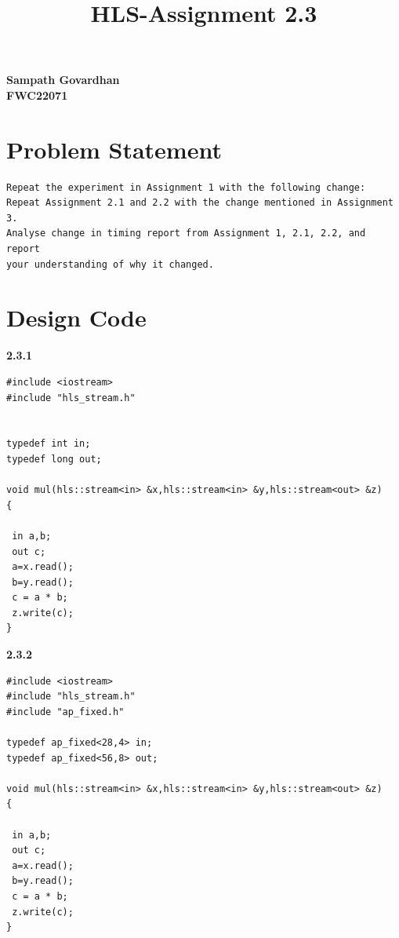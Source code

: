 \documentclass{article}
\title{
HLS-Assignment 2.3
}
\begin{document}
\maketitle
\hfill \textbf{Sampath Govardhan} \\
\null \hfill \textbf{FWC22071}\\
\tableofcontents
\section{Problem Statement}
\begin{lstlisting}
Repeat the experiment in Assignment 1 with the following change:
Repeat Assignment 2.1 and 2.2 with the change mentioned in Assignment 3.
Analyse change in timing report from Assignment 1, 2.1, 2.2, and report 
your understanding of why it changed. 
\end{lstlisting}
\vspace{10cm}


\section{Design Code}
\textbf{2.3.1}
\begin{lstlisting}
#include <iostream>
#include "hls_stream.h"


typedef int in;
typedef long out;

void mul(hls::stream<in> &x,hls::stream<in> &y,hls::stream<out> &z)
{

 in a,b;
 out c;
 a=x.read();
 b=y.read();
 c = a * b;
 z.write(c);
}

\end{lstlisting}
\vspace{2cm}
\textbf{2.3.2}
\begin{lstlisting}
#include <iostream>
#include "hls_stream.h"
#include "ap_fixed.h"

typedef ap_fixed<28,4> in;
typedef ap_fixed<56,8> out;

void mul(hls::stream<in> &x,hls::stream<in> &y,hls::stream<out> &z)
{

 in a,b;
 out c;
 a=x.read();
 b=y.read();
 c = a * b;
 z.write(c);
}


\end{lstlisting}
\vspace{5cm}
\end{document}
